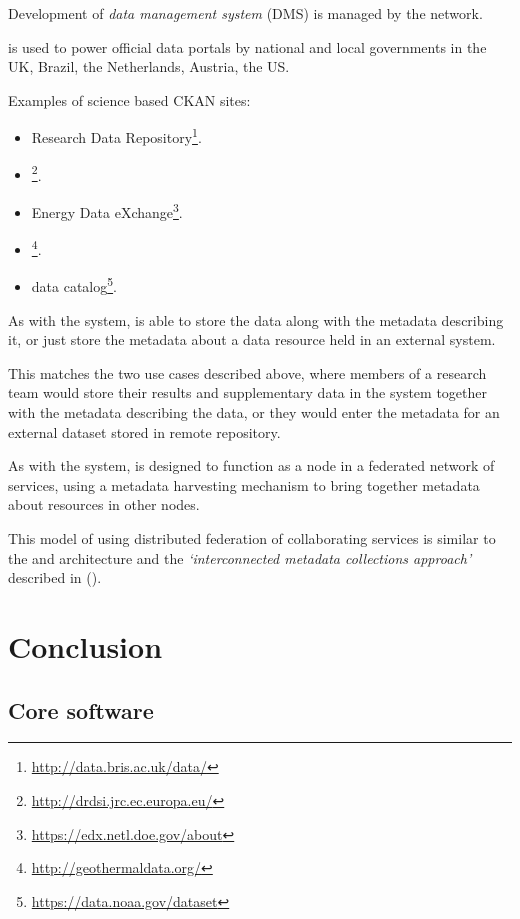 \documentclass{article}
\begin{document}
Development of \cite{ckan} \textit{data management system} (DMS) is managed
by the  network.

\cite{ckan} is used to power official data portals by national and local
governments in the UK, Brazil, the Netherlands, Austria, the US.

Examples of science based CKAN sites:
\begin{itemize}
    \item {} Research Data Repository\footnote{\url{http://data.bris.ac.uk/data/}}.
    \item {}\footnote{\url{http://drdsi.jrc.ec.europa.eu/}}.
    \item {} Energy Data eXchange\footnote{\url{https://edx.netl.doe.gov/about}}.
    \item {} \footnote{\url{http://geothermaldata.org/}}.
    \item {} data catalog\footnote{\url{https://data.noaa.gov/dataset}}.
\end{itemize}

As with the \cite{metacat} system, \cite{ckan} is able to store the data
along with the metadata describing it, or just store the metadata about
a data resource held in an external system.

This matches the two use cases described above, where members of a research
team would store their results and supplementary data in the \cite{trop}
system together with the metadata describing the data, or they would enter
the metadata for an external dataset stored in remote repository.

As with the \cite{metacat} system, \cite{ckan} is designed to function
as a node in a federated network of services, using a metadata harvesting
mechanism to bring together metadata about resources in other nodes.

This model of using distributed federation of collaborating services
is similar to the \cite{ivoa} and \cite{astro} architecture and the
\textit{`interconnected metadata collections approach'} described in
 (\cite{jones-2006}).

\section{Conclusion}

\subsection{Core software}
\end{document}
